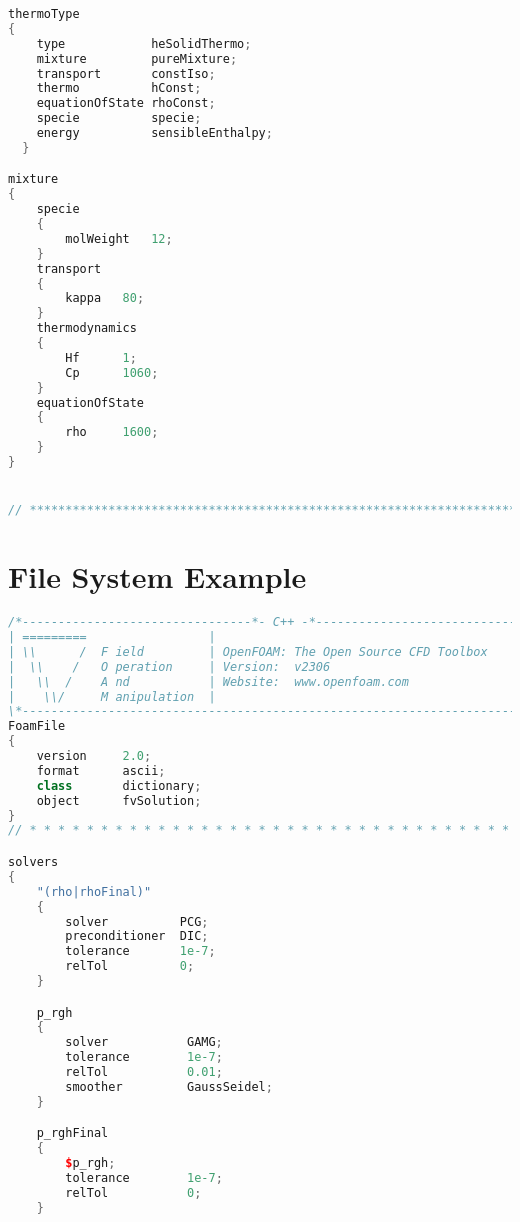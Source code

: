 \begin{theappendices}
\begin{lstlisting}[language=c++, caption=OF text file in constant/Brick/thermophysicalproperties]
thermoType
{
    type            heSolidThermo;
    mixture         pureMixture;
    transport       constIso;
    thermo          hConst;
    equationOfState rhoConst;
    specie          specie;
    energy          sensibleEnthalpy;
  }

mixture
{
    specie
    {
        molWeight   12;
    }
    transport
    {
        kappa   80;
    }
    thermodynamics
    {
        Hf      1;
        Cp      1060;
    }
    equationOfState
    {
        rho     1600;
    }
}


// ************************************************************************* //
\end{lstlisting}






\singlespacing
\chapter{File System Example}
\begin{lstlisting}[language=c++, caption=OF text file in System/Brick/fvsolution]
/*--------------------------------*- C++ -*----------------------------------*\
| =========                 |                                                 |
| \\      /  F ield         | OpenFOAM: The Open Source CFD Toolbox           |
|  \\    /   O peration     | Version:  v2306                                 |
|   \\  /    A nd           | Website:  www.openfoam.com                      |
|    \\/     M anipulation  |                                                 |
\*---------------------------------------------------------------------------*/
FoamFile
{
    version     2.0;
    format      ascii;
    class       dictionary;
    object      fvSolution;
}
// * * * * * * * * * * * * * * * * * * * * * * * * * * * * * * * * * * * * * //

solvers
{
    "(rho|rhoFinal)"
    {
        solver          PCG;
        preconditioner  DIC;
        tolerance       1e-7;
        relTol          0;
    }

    p_rgh
    {
        solver           GAMG;
        tolerance        1e-7;
        relTol           0.01;
        smoother         GaussSeidel;
    }

    p_rghFinal
    {
        $p_rgh;
        tolerance        1e-7;
        relTol           0;
    }


\end{lstlisting}
\end{theappendices}
